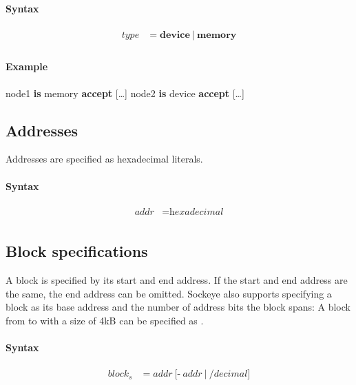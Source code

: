 \documentclass[a4paper,11pt,twoside]{report}
\begin{document}
{{{\paragraph{Syntax}
\begin{align*}
\textit{type} & \mathop{=}
    \textbf{device}\
    |\
    \textbf{memory} \\
\end{align*}

\paragraph{Example}
\begin{syntax}
    node1 \textbf{is} memory \textbf{accept} [\ldots]
    node2 \textbf{is} device \textbf{accept} [\ldots]
\end{syntax}

\subsection{Addresses}
Addresses are specified as hexadecimal literals.

\paragraph{Syntax}
\begin{align*}
\textit{addr} & \mathop{=} \textit{hexadecimal} \\
\end{align*}

\subsection{Block specifications}
A block is specified by its start and end address.
If the start and end address are the same, the end address can be omitted.
Sockeye also supports specifying a block as its base address and the number of address bits the block spans:
A block from \Sockeye{0x0} to \Sockeye{0xFFF} with a size of 4kB can be specified as .

\paragraph{Syntax}
\begin{align*}
\textit{block}_s & \mathop{=} \textit{addr}\
    \Big[
        \textbf{-}\ \textit{addr}\ 
    \Big|\
        \textbf{/}\textit{decimal}
    \Big] \\
\end{align*}

}}}
\end{document}
